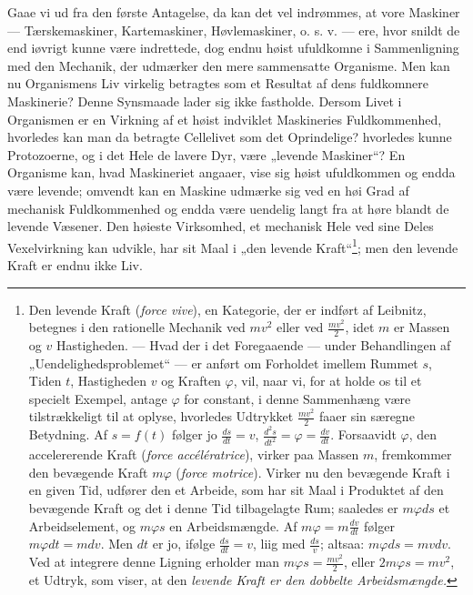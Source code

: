 \documentclass[12pt,a4paper]{book}
\begin{document}
Gaae vi ud fra den første Antagelse, da kan det vel indrømmes, at vore
Maskiner --- Tærskemaskiner, Kartemaskiner, Høvlemaskiner, o. s. v. ---
ere, hvor snildt de end iøvrigt kunne være indrettede, dog endnu høist
ufuldkomne i Sammenligning med den Mechanik, der udmærker den mere
sammensatte Organisme. Men kan nu Organismens Liv virkelig betragtes som
et Resultat af dens fuldkomnere Maskinerie? Denne Synsmaade lader sig
ikke fastholde. Dersom Livet i Organismen er en Virkning af et høist
indviklet Maskineries Fuldkommenhed, hvorledes kan man da betragte
Cellelivet som det Oprindelige? hvorledes kunne Protozoerne, og i det
Hele de lavere Dyr, være „levende Maskiner“? En Organisme kan, hvad
Maskineriet angaaer, vise sig høist ufuldkommen og endda være levende;
omvendt kan en Maskine udmærke sig ved en høi Grad af mechanisk
Fuldkommenhed og endda være uendelig langt fra at høre blandt de levende
Væsener. Den høieste Virksomhed, et mechanisk Hele ved sine Deles
Vexelvirkning kan udvikle, har sit Maal i „den levende
Kraft“\footnote{Den levende Kraft (\textit{force vive}), en Kategorie,
der er indført af Leibnitz, betegnes i den rationelle Mechanik ved $mv^2$
eller ved $\frac{mv^2}{2}$, idet $m$ er Massen og $v$ Hastigheden. ---
Hvad der i det Foregaaende --- under Behandlingen af
„Uendelighedsproblemet“ --- er anført om Forholdet imellem Rummet $s$,
Tiden $t$, Hastigheden $v$ og Kraften $\varphi$, vil, naar vi, for at
holde os til et specielt Exempel, antage $\varphi$ for constant, i denne
Sammenhæng være tilstrækkeligt til at oplyse, hvorledes Udtrykket
$\frac{mv^2}{2}$ faaer sin særegne Betydning. Af $s = f(t)$ følger jo
$\frac{ds}{dt} = v$, $\frac{d^2s}{dt^2} = \varphi = \frac{dv}{dt}$.
Forsaavidt $\varphi$, den accelererende Kraft (\textit{force
accélératrice}), virker paa Massen $m$, fremkommer den bevægende Kraft
$m\varphi$ (\textit{force motrice}). Virker nu den bevægende Kraft i en
given Tid, udfører den et Arbeide, som har sit Maal i Produktet af den
bevægende Kraft og det i denne Tid tilbagelagte Rum; saaledes er
$m\varphi ds$ et Arbeidselement, og $m\varphi s$ en Arbeidsmængde. Af
$m\varphi = m\frac{dv}{dt}$ følger $m\varphi dt = mdv$. Men $dt$ er jo,
ifølge $\frac{ds}{dt} = v$, liig med $\frac{ds}{v}$; altsaa: $m\varphi ds
= mvdv$. Ved at integrere denne Ligning erholder man $m\varphi s =
\frac{mv^2}{2}$, eller $2m\varphi s = mv^2$, et Udtryk, som viser, at den
\emph{levende Kraft er den dobbelte Arbeidsmængde.}}; men den levende
Kraft er endnu ikke Liv.
\end{document}
